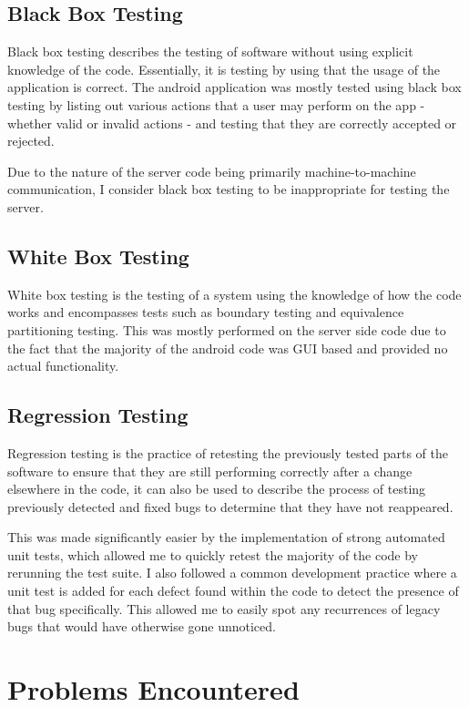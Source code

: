 \subsection{Black Box Testing}
Black box testing describes the testing of software without using explicit knowledge of the code.
Essentially, it is testing by using that the usage of the application is correct.
The android application was mostly tested using black box testing by listing out various actions that a user may perform on the app - whether valid or invalid actions - and testing that they are correctly accepted or rejected.

Due to the nature of the server code being primarily machine-to-machine communication, I consider black box testing to be inappropriate for testing the server.

\subsection{White Box Testing}
White box testing is the testing of a system using the knowledge of how the code works and encompasses tests such as boundary testing and equivalence partitioning testing.
This was mostly performed on the server side code due to the fact that the majority of the android code was GUI based and provided no actual functionality.

\subsection{Regression Testing}
Regression testing is the practice of retesting the previously tested parts of the software to ensure that they are still performing correctly after a change elsewhere in the code, it can also be used to describe the process of testing previously detected and fixed bugs to determine that they have not reappeared.

This was made significantly easier by the implementation of strong automated unit tests, which allowed me to quickly retest the majority of the code by rerunning the test suite.
I also followed a common development practice where a unit test is added for each defect found within the code to detect the presence of that bug specifically. 
This allowed me to easily spot any recurrences of legacy bugs that would have otherwise gone unnoticed.

\section{Problems Encountered}
